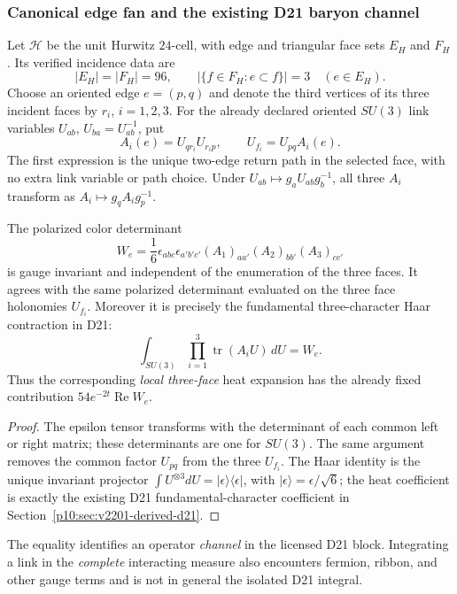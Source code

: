 \documentclass[12pt,a4paper]{article}
\begin{document}
\subsubsection{Canonical edge fan and the existing D21 baryon channel}
\label{p10:subsec:v2220-edge-fan}
Let $\mathscr H$ be the unit Hurwitz $24$-cell, with edge and triangular
face sets $E_H$ and $F_H$.  Its verified incidence data are
\[
 |E_H|=|F_H|=96,\qquad
 |\{f\in F_H:e\subset f\}|=3\quad(e\in E_H).
\]
Choose an oriented edge $e=(p,q)$ and denote the third vertices of its
three incident faces by $r_i$, $i=1,2,3$.  For the already declared
oriented $SU(3)$ link variables $U_{ab}$, $U_{ba}=U_{ab}^{-1}$, put
\begin{equation}
 \label{p10:eq:v2220-edge-fan-paths}
 A_i(e)=U_{qr_i}U_{r_ip},\qquad
 U_{f_i}=U_{pq}A_i(e).
\end{equation}
The first expression is the unique two-edge return path in the selected
face, with no extra link variable or path choice.  Under
$U_{ab}\mapsto g_aU_{ab}g_b^{-1}$, all three $A_i$ transform as
$A_i\mapsto g_qA_i g_p^{-1}$.

\begin{proposition}
\label{p10:prop:v2220-edge-fan-baryon}
The polarized color determinant
\begin{equation}
\label{p10:eq:v2220-baryon-wilson}
 W_e=\frac16\epsilon_{abc}\epsilon_{a'b'c'}
 (A_1)_{aa'}(A_2)_{bb'}(A_3)_{cc'}
\end{equation}
is gauge invariant and independent of the enumeration of the three
faces.  It agrees with the same polarized determinant evaluated on the
three face holonomies $U_{f_i}$.  Moreover it is precisely the
fundamental three-character Haar contraction in D21:
\[
 \int_{SU(3)}\prod_{i=1}^3\operatorname{tr}(A_iU)\,dU=W_e.
\]
Thus the corresponding \emph{local three-face} heat expansion has the
already fixed contribution $54e^{-2t}\operatorname{Re}W_e$.
\end{proposition}
\begin{proof}
The epsilon tensor transforms with the determinant of each common left
or right matrix; these determinants are one for $SU(3)$.  The same
argument removes the common factor $U_{pq}$ from the three $U_{f_i}$.
The Haar identity is the unique invariant projector
$\int U^{\otimes3}dU=|\epsilon\rangle\langle\epsilon|$, with
$|\epsilon\rangle=\epsilon/\sqrt6$; the heat coefficient is exactly the
existing D21 fundamental-character coefficient in
Section~\ref{p10:sec:v2201-derived-d21}.
\end{proof}
The equality identifies an operator \emph{channel} in the licensed D21
block.  Integrating a link in the \emph{complete} interacting measure also
encounters fermion, ribbon, and other gauge terms and is not in general
the isolated D21 integral.
\end{document}
